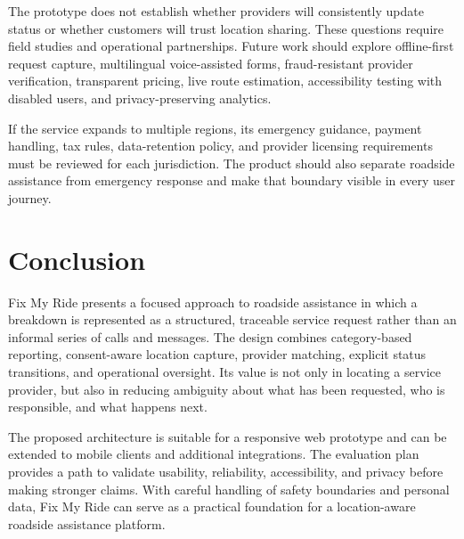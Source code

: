\documentclass[conference]{IEEEtran}
\begin{document}
The prototype does not establish whether providers will consistently update status or whether customers will trust location sharing. These questions require field studies and operational partnerships. Future work should explore offline-first request capture, multilingual voice-assisted forms, fraud-resistant provider verification, transparent pricing, live route estimation, accessibility testing with disabled users, and privacy-preserving analytics.

If the service expands to multiple regions, its emergency guidance, payment handling, tax rules, data-retention policy, and provider licensing requirements must be reviewed for each jurisdiction. The product should also separate roadside assistance from emergency response and make that boundary visible in every user journey.

\section{Conclusion}
Fix My Ride presents a focused approach to roadside assistance in which a breakdown is represented as a structured, traceable service request rather than an informal series of calls and messages. The design combines category-based reporting, consent-aware location capture, provider matching, explicit status transitions, and operational oversight. Its value is not only in locating a service provider, but also in reducing ambiguity about what has been requested, who is responsible, and what happens next.

The proposed architecture is suitable for a responsive web prototype and can be extended to mobile clients and additional integrations. The evaluation plan provides a path to validate usability, reliability, accessibility, and privacy before making stronger claims. With careful handling of safety boundaries and personal data, Fix My Ride can serve as a practical foundation for a location-aware roadside assistance platform.
\end{document}
